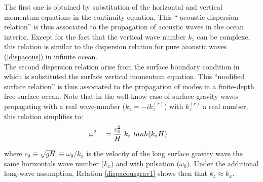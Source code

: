 \documentclass[a4paper]{article}
\numberwithin{equation}{section}
\begin{document}
  The first one is obtained by substitution of the horizontal and vertical momentum equations in the continuity equation. This `` acoustic dispersion relation'' is thus associated to the propagation of acoustic waves in the ocean interior. Except for the fact that the vertical wave number $k_z$ can be complexe, this relation is similar to the dispersion relation for pure acoustic waves (\ref{dispacous}) in infinite ocean.\\
  The second dispersion relation arise from the surface boundary condition in which is substituted the surface vertical momentum equation.
  This ``modified surface relation'' is thus associated to the propagation of modes in a finite-depth free-surface ocean. Note that in the well-know case of surface gravity waves propagating with a real wave-number ($k_z=-ik_z^{(r)}$) with $k_z^{(r)}$ a real number, this relation simplifies to:
  \begin{equation}
    \begin{split}
      \displaystyle
      &\omega^2 &&= \frac{c_0^2}{H}\ k_z\ tanh(k_zH)
    \end{split}
  \end{equation}

where $c_0 \equiv \sqrt{gH} \equiv \omega_0 / k_x$ is the velocity of the long surface gravity wave the same horizontals wave number ($k_x$) and with pulsation ($\omega_0$). Under the additional long-wave assumption, Relation \ref{dispacousgrav1} shows then that $k_z \approx k_x$.
\end{document}
